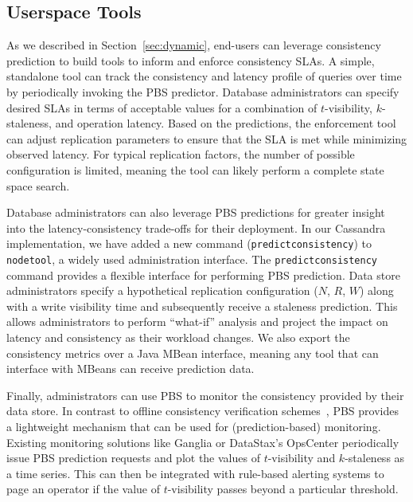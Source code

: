 \subsection{Userspace Tools}

As we described in Section~\ref{sec:dynamic}, end-users can leverage
consistency prediction to build tools to inform and enforce
consistency SLAs. A simple, standalone tool can track the consistency
and latency profile of queries over time by periodically invoking the
PBS predictor. Database administrators can specify desired SLAs in
terms of acceptable values for a combination of $t$-visibility,
$k$-staleness, and operation latency. Based on the predictions, the
enforcement tool can adjust replication parameters to ensure that the
SLA is met while minimizing observed latency. For typical replication
factors, the number of possible configuration is limited, meaning the
tool can likely perform a complete state space search.

Database administrators can also leverage PBS predictions for greater
insight into the latency-consistency trade-offs for their
deployment. In our Cassandra implementation, we have added a new
command (\texttt{predictconsistency}) to \texttt{nodetool}, a widely
used administration interface.  The \texttt{predictconsistency}
command provides a flexible interface for performing PBS
prediction. Data store administrators specify a hypothetical
replication configuration ($N$, $R$, $W$) along with a write
visibility time and subsequently receive a staleness prediction. This
allows administrators to perform ``what-if'' analysis and project the
impact on latency and consistency as their workload changes.  We also
export the consistency metrics over a Java MBean interface, meaning
any tool that can interface with MBeans can receive prediction data.


Finally, administrators can use PBS to monitor the consistency
provided by their data store. In contrast to offline consistency
verification schemes~\cite{podc-hpl}, PBS provides a lightweight
mechanism that can be used for (prediction-based) monitoring. Existing
monitoring solutions like Ganglia or DataStax's OpsCenter periodically
issue PBS prediction requests and plot the values of $t$-visibility
and $k$-staleness as a time series. This can then be integrated with
rule-based alerting systems to page an operator if the value of
$t$-visibility passes beyond a particular threshold.
